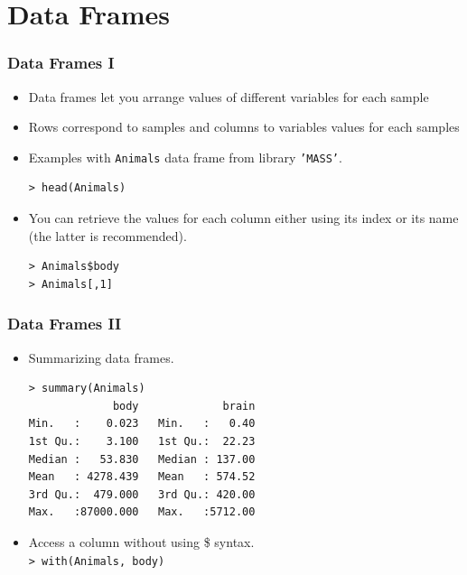 \documentclass{beamer}
\begin{document}

\section{Data Frames}


\begin{frame}[fragile]

 \frametitle{Data Frames I}
 \begin{itemize}
  \item Data frames let you arrange values of different variables for each sample
  \item Rows correspond to samples and columns to variables values for each samples
  \item Examples with \texttt{Animals} data frame from library \texttt{'MASS'}.
  \begin{verbatim}
> head(Animals)
  \end{verbatim}
  \vspace{-0.4cm}
  \item You can retrieve the values for each column either using 
  its index or its name (the latter is recommended).
  \begin{verbatim}
> Animals$body
> Animals[,1]
  \end{verbatim}
 \end{itemize}

\end{frame}


\begin{frame}[fragile]

 \frametitle{Data Frames II}
 \begin{itemize}
  \item Summarizing data frames.
  \begin{verbatim}
> summary(Animals)
             body             brain
Min.   :    0.023   Min.   :   0.40
1st Qu.:    3.100   1st Qu.:  22.23
Median :   53.830   Median : 137.00
Mean   : 4278.439   Mean   : 574.52
3rd Qu.:  479.000   3rd Qu.: 420.00
Max.   :87000.000   Max.   :5712.00
  \end{verbatim}
 \end{itemize}
 \begin{itemize}
 \vspace{-0.7cm}
 \item Access a column without using \$ syntax.\\
 \texttt{> with(Animals, body)}\\
 \end{itemize}

\end{frame}
\end{document}
